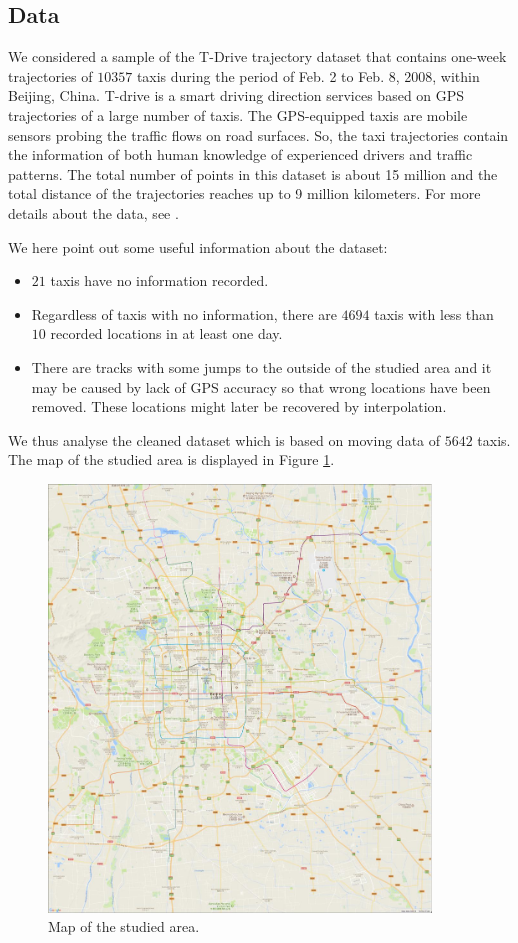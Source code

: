 \documentclass[article]{jss}
\begin{document}
\subsection{Data}
  We considered a sample of the T-Drive trajectory dataset that contains one-week trajectories of $10357$ taxis during the period of Feb. 2 to Feb. 8, 2008, within Beijing, China. T-drive is a smart driving direction services based on GPS trajectories of a large number of taxis. The GPS-equipped taxis are mobile sensors probing the traffic flows on road surfaces. So, the taxi trajectories contain the information of both human knowledge of experienced drivers and traffic patterns. The total number of points in this dataset is about 15 million and the total distance of the trajectories reaches up to 9 million kilometers. For more details about the data, see \cite{yuan10,yuan11}. 
  
We here point out some useful information about the dataset:
\begin{itemize}
  \item $21$ taxis have no information recorded.
  \item Regardless of taxis with no information, there are $4694$ taxis with less than $10$ recorded locations in at least one day. 
  \item There are tracks with some jumps to the outside of the studied area and it may be caused by lack of GPS accuracy so that wrong locations have been removed. These locations might later be recovered by interpolation.
\end{itemize}
  We thus analyse the cleaned dataset which is based on moving data of $5642$ taxis. The map of the studied area is displayed in Figure \ref{Beijingmapgoogle}.
  \begin{figure}[!h]
  \centering
  \includegraphics[width = 4in]{Beijingmap}
  \caption{Map of the studied area.}
  \label{Beijingmapgoogle}
  \end{figure}
  
\end{document}

